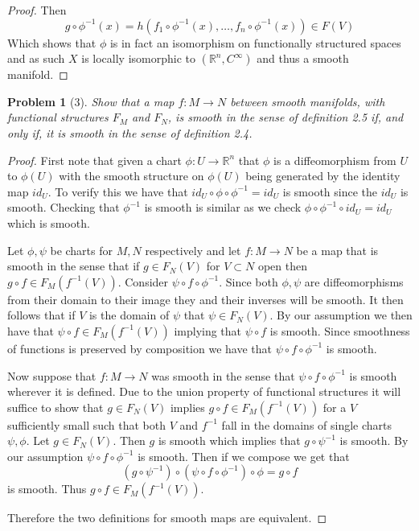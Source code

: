 \documentclass[10pt]{article}
\newcommand{\sk}{\vskip 10mm}
\newcommand{\bb}[1]{\mathbb{#1}}
\theoremstyle{plain}
\newtheorem{problem}{Problem}
\theoremstyle{remark}
\begin{document}
\begin{proof}
  Then
  \[ g\circ\phi^{-1}(x)=h(f_1\circ\phi^{-1}(x),\ldots,f_n\circ \phi^{-1}(x)) \in F(V) \]
  Which shows that $\phi$ is in fact an isomorphism on functionally
  structured spaces and as such $X$ is locally isomorphic to
  $(\bb{R}^n,C^\infty)$ and thus a smooth manifold.
\end{proof}

\sk

\begin{problem}[3]
  Show that a map $f:M\rightarrow N$ between smooth manifolds, with functional
  structures $F_M$ and $F_N$, is smooth in the sense of definition 2.5
  if, and only if, it is smooth in the sense of definition 2.4.
\end{problem}

\begin{proof}
  First note that given a chart $\phi:U\rightarrow\bb{R}^n$ that $\phi$ is a diffeomorphism
  from $U$ to $\phi(U)$ with the smooth structure on $\phi(U)$ being generated
  by the identity map $id_U$. To verify this we have that 
  $id_U\circ\phi\circ\phi^{-1}=id_U$ is smooth since the $id_U$ is smooth. Checking that $\phi^{-1}$
  is smooth is similar as we check $\phi\circ\phi^{-1}\circ id_U=id_U$ which is smooth.
  
  Let $\phi,\psi$ be charts for $M,N$ respectively and let $f:M\rightarrow N$ be a map that
  is smooth in the sense that if $g\in F_N(V)$ for $V\subset N$ open then
  $g\circ f\in F_M(f^{-1}(V))$. Consider $\psi\circ f\circ \phi^{-1}$. Since both $\phi,\psi$ are diffeomorphisms
  from their domain to their image they and their inverses will be smooth. It then
  follows that if $V$ is the domain of $\psi$ that $\psi\in F_N(V)$. By
  our assumption we then have that $\psi\circ f\in F_M(f^{-1}(V))$ implying that
  $\psi\circ f$ is smooth. Since smoothness of functions is preserved by composition
  we have that $\psi\circ f\circ\phi^{-1}$ is smooth.

  Now suppose that $f:M\rightarrow N$ was smooth in the sense that $\psi\circ f\circ \phi^{-1}$ is smooth
  wherever it is defined. Due to the union property of functional structures
  it will suffice to show that $g\in F_N(V)$ implies $g\circ f\in F_M(f^{-1}(V))$
  for a $V$ sufficiently small such that both $V$ and $f^{-1}$ fall in the
  domains of single charts $\psi,\phi$. Let $g\in F_N(V)$. Then $g$ is smooth
  which implies that $g\circ\psi^{-1}$ is smooth. By our assumption
  $\psi\circ f\circ \phi^{-1}$ is smooth. Then if we compose we get that
  \[ (g\circ\psi^{-1})\circ(\psi\circ f\circ\phi^{-1})\circ\phi =g\circ f\]
  is smooth. Thus $g\circ f\in F_M(f^{-1}(V))$.

  Therefore the two definitions for smooth maps are equivalent.
\end{proof}
\end{document}
